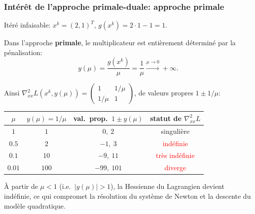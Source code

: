 \documentclass[t,usepdftitle=false,aspectratio=169]{beamer}
\begin{document}
\begin{frame}[shrink=2]
\frametitle{Intérêt de l'approche primale-duale: approche primale}

Itéré infaisable: $x^k=(2,1)^T$, $g(x^k) = 2\cdot 1-1 = 1$.

Dans l'approche \textbf{primale}, le multiplicateur est entièrement déterminé par la pénalisation:
$$
y(\mu) = \frac{g(x^k)}{\mu} = \frac{1}{\mu} \xrightarrow{\mu\to 0} +\infty.
$$

Ainsi $\nabla^2_{xx}L(x^k,y(\mu)) = \begin{pmatrix}1&1/\mu\\1/\mu&1\end{pmatrix}$, de valeurs propres $1\pm 1/\mu$:
\begin{center}
\begin{tabular}{c|c|c|c}
$\mu$ & $y(\mu)=1/\mu$ & val.\ prop.\ $1\pm y(\mu)$ & statut de $\nabla^2_{xx}L$ \\\hline
$1$    & $1$   & $0,\ 2$       & singulière \\
$0.5$  & $2$   & $-1,\ 3$     & \textcolor{red}{indéfinie} \\
$0.1$  & $10$  & $-9,\ 11$    & \textcolor{red}{très indéfinie} \\
$0.01$ & $100$ & $-99,\ 101$  & \textcolor{red}{diverge} \\
\end{tabular}
\end{center}

À partir de $\mu < 1$ (i.e.\ $|y(\mu)|>1$), la Hessienne du Lagrangien devient indéfinie, ce qui compromet la résolution du système de Newton et la descente du modèle quadratique.

\end{frame}
\end{document}
